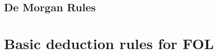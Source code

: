 \begin{multicols}{2}
\subsection*{De Morgan Rules}
\begin{fitchproof}
\end{fitchproof}
\begin{fitchproof}
\end{fitchproof}
\begin{fitchproof}
\end{fitchproof}
\begin{fitchproof}
\end{fitchproof}
\end{multicols}

\newpage

\section{Basic deduction rules for FOL}

